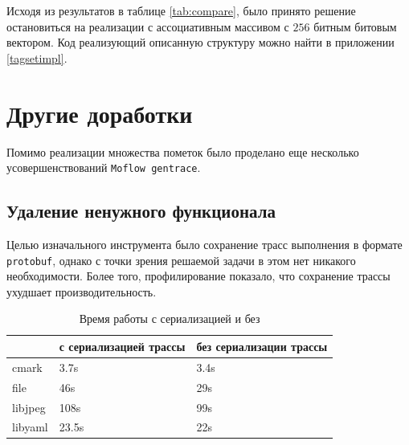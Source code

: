 \begin{table}[H]
    \caption{Время работы в секундах для различных реализаций} \label{tab:compare}
\end{table}

Исходя из результатов в таблице \ref{tab:compare}, было принято решение остановиться на реализации с ассоциативным массивом с $256$ битным битовым вектором. Код реализующий описанную структуру можно найти в приложении \ref{tagsetimpl}.

\section{Другие доработки}

Помимо реализации множества пометок было проделано еще несколько усовершенствований \texttt{Moflow gentrace}.

\subsection{Удаление ненужного функционала}

Целью изначального инструмента было сохранение трасс выполнения в формате \texttt{protobuf}, однако с точки зрения решаемой задачи в этом нет никакого необходимости. Более того, профилирование показало, что сохранение трассы ухудшает производительность.


\begin{table}[H]
    \centering
    \caption{Время работы с сериализацией и без} \label{tab:compare2}
    \begin{tabular}[]{@{}lll@{}}
    \toprule
    & с сериализацией трассы & без сериализации трассы  \tabularnewline
    \midrule
    cmark & 3.7s & 3.4s \tabularnewline
    file & 46s & 29s \tabularnewline
    libjpeg & 108s & 99s \tabularnewline
    libyaml & 23.5s & 22s \tabularnewline
    \bottomrule
\end{tabular}
\end{table}

